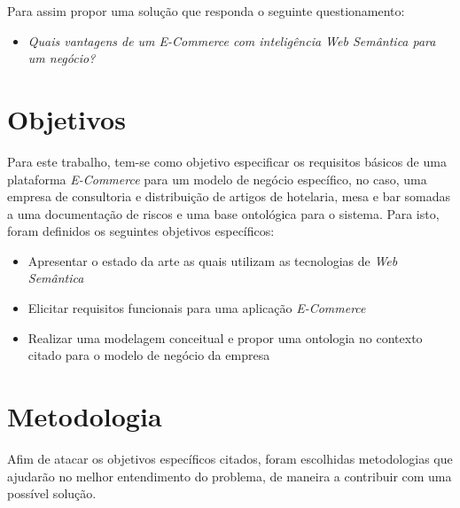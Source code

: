 	Para assim propor uma solução que responda o seguinte questionamento:
	\begin{itemize}
	\item{\textit{Quais vantagens de um E-Commerce com inteligência Web Semântica para um negócio?}}
	\end{itemize}

\section{Objetivos}

Para este trabalho, tem-se como objetivo especificar os requisitos básicos de uma plataforma \textit{E-Commerce} para um modelo de negócio específico, no caso, uma empresa de consultoria e distribuição de artigos de hotelaria, mesa e bar somadas a uma documentação de riscos e uma base ontológica para o sistema. Para isto, foram definidos os seguintes objetivos específicos:

	\begin{itemize}
	\item{Apresentar o estado da arte as quais utilizam as tecnologias de \textit{Web Semântica}}
	\item{Elicitar requisitos funcionais para uma aplicação \textit{E-Commerce}}
	\item{Realizar uma modelagem conceitual e propor uma ontologia no contexto citado para o modelo de negócio da empresa}
	\end{itemize}

\section{Metodologia}

Afim de atacar os objetivos específicos citados, foram escolhidas metodologias que ajudarão no melhor entendimento do problema, de maneira a contribuir com uma possível solução.

